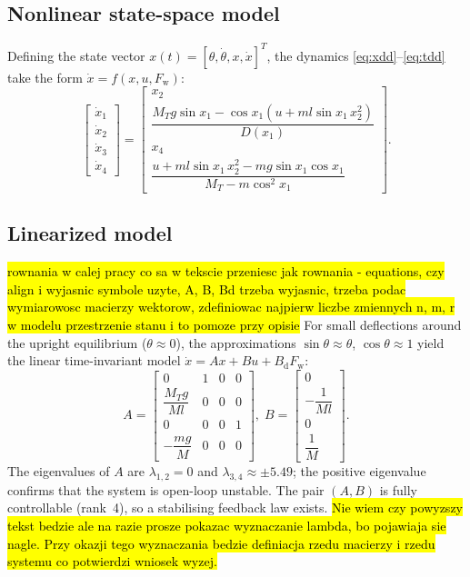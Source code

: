 \documentclass[twocolumn]{svjour3}
\begin{document}
\subsection{Nonlinear state-space model}

Defining the state vector $x(t) = [\theta,\dot{\theta},x,\dot{x}]^T$,
the dynamics \eqref{eq:xdd}--\eqref{eq:tdd} take the form $\dot{x} = f(x,u,F_\mathrm{w})$:
\begin{equation}
\begin{bmatrix}\dot{x}_1\\\dot{x}_2\\\dot{x}_3\\\dot{x}_4\end{bmatrix}
=
\begin{bmatrix}
x_2\\[2pt]
\dfrac{M_T g\sin x_1 - \cos x_1\!\left(u + ml\sin x_1\,x_2^{2}\right)}{D(x_1)}\\[6pt]
x_4\\[2pt]
\dfrac{u + ml\sin x_1\,x_2^{2} - mg\sin x_1\cos x_1}{M_T - m\cos^{2}\!x_1}
\end{bmatrix}.
\label{eq:nonlin_ss}
\end{equation}

\subsection{Linearized model}
\hl{rownania w calej pracy co sa w tekscie przeniesc jak rownania - equations, czy align i wyjasnic symbole uzyte, A, B, Bd trzeba wyjasnic, trzeba podac wymiarowosc macierzy wektorow, zdefiniowac najpierw liczbe zmiennych n, m, r w modelu przestrzenie stanu i to pomoze przy opisie}
For small deflections around the upright equilibrium ($\theta\approx 0$), the approximations
$\sin\theta\approx\theta$, $\cos\theta\approx 1$ yield the linear time-invariant
model $\dot{x} = Ax + Bu + B_\mathrm{d}F_\mathrm{w}$:
\begin{equation}
A = \begin{bmatrix}0&1&0&0\\ \dfrac{M_T g}{Ml}&0&0&0\\[4pt]0&0&0&1\\[2pt]-\dfrac{mg}{M}&0&0&0\end{bmatrix},\;
B = \begin{bmatrix}0\\[2pt]-\dfrac{1}{Ml}\\[4pt]0\\[2pt]\dfrac{1}{M}\end{bmatrix}.
\label{eq:linear}
\end{equation}
The eigenvalues of $A$ are $\lambda_{1,2}=0$ and $\lambda_{3,4}\approx\pm 5.49$; the positive
eigenvalue confirms that the system is open-loop unstable. The pair $(A,B)$ is fully
controllable (rank~4), so a stabilising feedback law exists.
    \hl{Nie wiem czy powyzszy tekst bedzie ale na razie prosze pokazac wyznaczanie lambda, bo pojawiaja sie nagle. Przy okazji tego wyznaczania bedzie definiacja rzedu macierzy i rzedu systemu co potwierdzi wniosek wyzej.}
\end{document}
